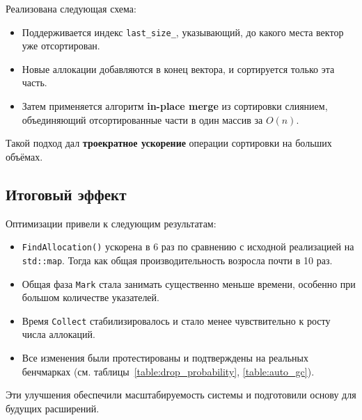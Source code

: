 Реализована следующая схема:

\begin{itemize}
    \item Поддерживается индекс \texttt{last\_size\_}, указывающий, до какого места вектор уже отсортирован.
    \item Новые аллокации добавляются в конец вектора, и сортируется только эта часть.
    \item Затем применяется алгоритм \textbf{in-place merge} из сортировки слиянием, объединяющий отсортированные части в один массив за \(O(n)\).
\end{itemize}

Такой подход дал \textbf{троекратное ускорение} операции сортировки на больших объёмах.

\subsection{Итоговый эффект}

Оптимизации привели к следующим результатам:
\begin{itemize}
    \item \texttt{FindAllocation()} ускорена в 6 раз по сравнению с исходной реализацией на \texttt{std::map}. Тогда как общая производительность возросла почти в 10 раз.
    \item Общая фаза \texttt{Mark} стала занимать существенно меньше времени, особенно при большом количестве указателей.
    \item Время \texttt{Collect} стабилизировалось и стало менее чувствительно к росту числа аллокаций.
    \item Все изменения были протестированы и подтверждены на реальных бенчмарках (см. таблицы~\ref{table:drop_probability}, \ref{table:auto_gc}).
\end{itemize}

Эти улучшения обеспечили масштабируемость системы и подготовили основу для будущих расширений.
